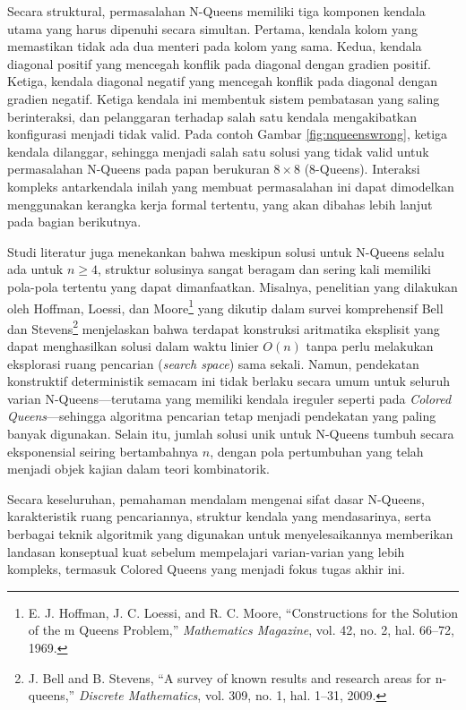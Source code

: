 \documentclass[a4paper,twoside]{article}
\begin{document}
	Secara struktural, permasalahan N-Queens memiliki tiga komponen kendala utama yang harus dipenuhi secara simultan. Pertama, kendala kolom yang memastikan tidak ada dua menteri pada kolom yang sama. Kedua, kendala diagonal positif yang mencegah konflik pada diagonal dengan gradien positif. Ketiga, kendala diagonal negatif yang mencegah konflik pada diagonal dengan gradien negatif. Ketiga kendala ini membentuk sistem pembatasan yang saling berinteraksi, dan pelanggaran terhadap salah satu kendala mengakibatkan konfigurasi menjadi tidak valid. Pada contoh Gambar \ref{fig:nqueenswrong}, ketiga kendala dilanggar, sehingga menjadi salah satu solusi yang tidak valid untuk permasalahan N-Queens pada papan berukuran $8 \times 8$ (8-Queens). Interaksi kompleks antarkendala inilah yang membuat permasalahan ini dapat dimodelkan menggunakan kerangka kerja formal tertentu, yang akan dibahas lebih lanjut pada bagian berikutnya.
	
	Studi literatur juga menekankan bahwa meskipun solusi untuk N-Queens selalu ada untuk $n \geq 4$, struktur solusinya sangat beragam dan sering kali memiliki pola-pola tertentu yang dapat dimanfaatkan. Misalnya, penelitian yang dilakukan oleh Hoffman, Loessi, dan Moore\footnote{E. J. Hoffman, J. C. Loessi, and R. C. Moore, ``Constructions for the Solution of the m Queens Problem,'' \textit{Mathematics Magazine}, vol. 42, no. 2, hal. 66–72, 1969.} yang dikutip dalam survei komprehensif Bell dan Stevens\footnote{J. Bell and B. Stevens, ``A survey of known results and research areas for n-queens,'' \textit{Discrete Mathematics}, vol. 309, no. 1, hal. 1–31, 2009.} menjelaskan bahwa terdapat konstruksi aritmatika eksplisit yang dapat menghasilkan solusi dalam waktu linier $O(n)$ tanpa perlu melakukan eksplorasi ruang pencarian (\textit{search space}) sama sekali. Namun, pendekatan konstruktif deterministik semacam ini tidak berlaku secara umum untuk seluruh varian N-Queens—terutama yang memiliki kendala ireguler seperti pada \textit{Colored Queens}—sehingga algoritma pencarian tetap menjadi pendekatan yang paling banyak digunakan. Selain itu, jumlah solusi unik untuk N-Queens tumbuh secara eksponensial seiring bertambahnya $n$, dengan pola pertumbuhan yang telah menjadi objek kajian dalam teori kombinatorik.
	
	Secara keseluruhan, pemahaman mendalam mengenai sifat dasar N-Queens, karakteristik ruang pencariannya, struktur kendala yang mendasarinya, serta berbagai teknik algoritmik yang digunakan untuk menyelesaikannya memberikan landasan konseptual kuat sebelum mempelajari varian-varian yang lebih kompleks, termasuk Colored Queens yang menjadi fokus tugas akhir ini.
	
\end{document}
